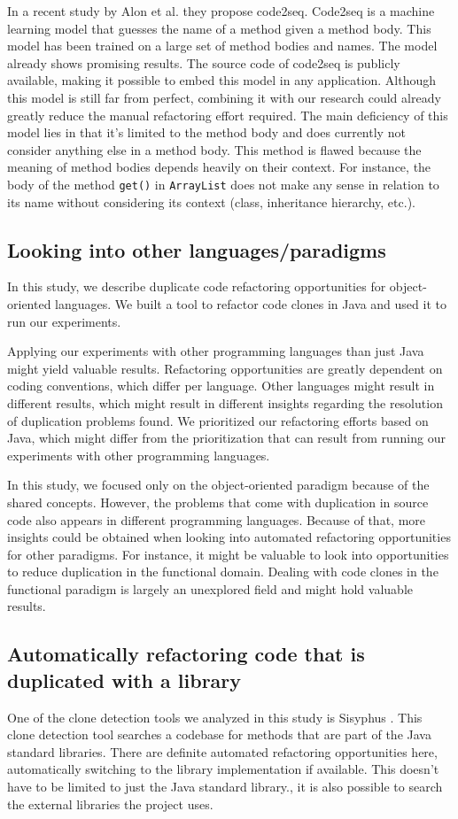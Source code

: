 In a recent study by Alon et al. \cite{alon2018code2seq} they propose code2seq. Code2seq is a machine learning model that guesses the name of a method given a method body. This model has been trained on a large set of method bodies and names. The model already shows promising results. The source code of code2seq is publicly available, making it possible to embed this model in any application. Although this model is still far from perfect, combining it with our research could already greatly reduce the manual refactoring effort required. The main deficiency of this model lies in that it's limited to the method body and does currently not consider anything else in a method body. This method is flawed because the meaning of method bodies depends heavily on their context. For instance, the body of the method \texttt{get()} in \texttt{ArrayList} does not make any sense in relation to its name without considering its context (class, inheritance hierarchy, etc.).

\subsection{Looking into other languages/paradigms}
In this study, we describe duplicate code refactoring opportunities for object-oriented languages. We built a tool to refactor code clones in Java and used it to run our experiments.

Applying our experiments with other programming languages than just Java might yield valuable results. Refactoring opportunities are greatly dependent on coding conventions, which differ per language. Other languages might result in different results, which might result in different insights regarding the resolution of duplication problems found. We prioritized our refactoring efforts based on Java, which might differ from the prioritization that can result from running our experiments with other programming languages.

In this study, we focused only on the object-oriented paradigm because of the shared concepts. However, the problems that come with duplication in source code also appears in different programming languages. Because of that, more insights could be obtained when looking into automated refactoring opportunities for other paradigms. For instance, it might be valuable to look into opportunities to reduce duplication in the functional domain. Dealing with code clones in the functional paradigm is largely an unexplored field and might hold valuable results.

\subsection{Automatically refactoring code that is duplicated with a library}
One of the clone detection tools we analyzed in this study is Sisyphus \cite{eremondi2017sisyphus}. This clone detection tool searches a codebase for methods that are part of the Java standard libraries. There are definite automated refactoring opportunities here, automatically switching to the library implementation if available. This doesn't have to be limited to just the Java standard library., it is also possible to search the external libraries the project uses.
